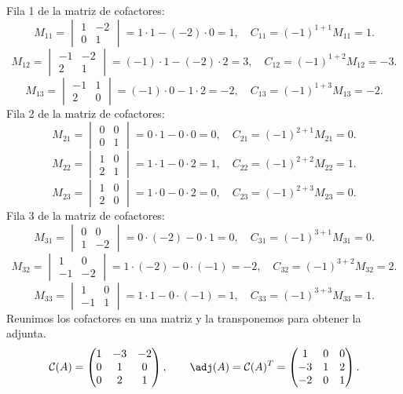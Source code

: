 Fila 1 de la matriz de cofactores:
\[
M_{11}=\begin{vmatrix}1&-2\\0&1\end{vmatrix}=1\cdot 1-(-2)\cdot 0=1,\quad C_{11}=(-1)^{1+1}M_{11}=1.
\]
\[
M_{12}=\begin{vmatrix}-1&-2\\2&1\end{vmatrix}=(-1)\cdot 1-(-2)\cdot 2=3,\quad C_{12}=(-1)^{1+2}M_{12}=-3.
\]
\[
M_{13}=\begin{vmatrix}-1&1\\2&0\end{vmatrix}=(-1)\cdot 0-1\cdot 2=-2,\quad C_{13}=(-1)^{1+3}M_{13}=-2.
\]
Fila 2 de la matriz de cofactores:
\[
M_{21}=\begin{vmatrix}0&0\\0&1\end{vmatrix}=0\cdot 1-0\cdot 0=0,\quad C_{21}=(-1)^{2+1}M_{21}=0.
\]
\[
M_{22}=\begin{vmatrix}1&0\\2&1\end{vmatrix}=1\cdot 1-0\cdot 2=1,\quad C_{22}=(-1)^{2+2}M_{22}=1.
\]
\[
M_{23}=\begin{vmatrix}1&0\\2&0\end{vmatrix}=1\cdot 0-0\cdot 2=0,\quad C_{23}=(-1)^{2+3}M_{23}=0.
\]
Fila 3 de la matriz de cofactores:
\[
M_{31}=\begin{vmatrix}0&0\\1&-2\end{vmatrix}=0\cdot (-2)-0\cdot 1=0,\quad C_{31}=(-1)^{3+1}M_{31}=0.
\]
\[
M_{32}=\begin{vmatrix}1&0\\-1&-2\end{vmatrix}=1\cdot (-2)-0\cdot (-1)=-2,\quad C_{32}=(-1)^{3+2}M_{32}=2.
\]
\[
M_{33}=\begin{vmatrix}1&0\\-1&1\end{vmatrix}=1\cdot 1-0\cdot (-1)=1,\quad C_{33}=(-1)^{3+3}M_{33}=1.
\]
Reunimos los cofactores en una matriz y la transponemos para obtener la adjunta.
\[
\mathcal{C}(A)=\begin{pmatrix}1&-3&-2\\0&1&0\\0&2&1\end{pmatrix},\qquad\adj(A)=\mathcal{C}(A)^T=\begin{pmatrix}1&0&0\\-3&1&2\\-2&0&1\end{pmatrix}.
\]
